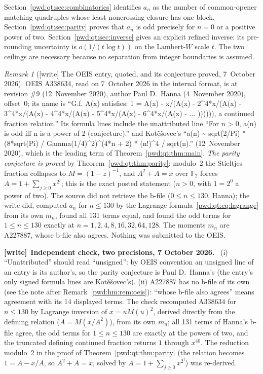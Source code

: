 \documentclass[11pt,letterpaper]{article}
\numberwithin{equation}{section}
\theoremstyle{remark}\newtheorem{remark}[theorem]{Remark}
\newenvironment{writenote}[1][]{\par\smallskip\begingroup\small
 \noindent\textbf{[write]}\if\relax\detokenize{#1}\relax\else~\textbf{#1.}\fi\ }%
 {\par\endgroup\smallskip}
\begin{document}
Section~\ref{pwd:qt:sec:combinatorics} identifies $a_n$ as the number of common-opener matching quadruples whose least noncrossing closure has one block. Section~\ref{pwd:qt:sec:parity} proves that $a_n$ is odd precisely for $n=0$ or a positive power of two. Section~\ref{pwd:qt:sec:inverse} gives an explicit refined inverse: its pre-rounding uncertainty is $o(1/(t\log t))$ on the Lambert-$W$ scale $t$. The two ceilings are necessary because no separation from integer boundaries is assumed.

\begin{remark}[{[write]} The OEIS entry, quoted, and its conjecture proved, 7~October 2026]\label{pwd:qt:rem:oeis}
OEIS A338634, read on 7~October 2026 in the internal format, is at revision
\#9 (12~November 2020), author Paul D.~Hanna (4~November 2020), offset~0; its
name is ``G.f. A(x) satisfies: 1 = A(x) - x/(A(x) - 2\^{}4*x/(A(x) -
3\^{}4*x/(A(x) - 4\^{}4*x/(A(x) - 5\^{}4*x/(A(x) - 6\^{}4*x/(A(x) - ...
)))))), a continued fraction relation.'' Its formula lines include
the unattributed line ``For n > 0, a(n) is odd iff n is a power of 2
(conjecture).'' and Kot\v e\v sovec's ``a(n) \textasciitilde{} sqrt(2/Pi) *
(8*sqrt(Pi) / Gamma(1/4)\^{}2)\^{}(4*n + 2) * (n!)\^{}4 / sqrt(n).'' (12~November
2020), which is the leading term of Theorem~\ref{pwd:qt:thm:main}. \emph{The
parity conjecture is proved} by Theorem~\ref{pwd:qt:thm:parity}: modulo~2 the
Stieltjes fraction collapses to $M=(1-z)^{-1}$, and $A^2+A=x$ over
$\mathbb F_2$ forces $A=1+\sum_{j\ge0}x^{2^j}$; this is the exact posted
statement ($n>0$, with $1=2^0$ a power of two). The source did not retrieve
the b-file ($0\le n\le130$, Hanna); the write did, computed $a_n$ for
$n\le130$ by the Lagrange formula~\eqref{pwd:qt:eq:lagrange} from its own
$m_n$, found all 131 terms equal, and found the odd terms for $1\le n\le130$
exactly at $n=1,2,4,8,16,32,64,128$. The moments $m_n$ are A227887, whose
b-file also agrees. Nothing was submitted to the OEIS.
\end{remark}
\begin{writenote}[Independent check, two precisions, 7 October 2026]
(i) ``Unattributed'' should read ``unsigned'': by OEIS convention an
unsigned line of an entry is its author's, so the parity conjecture is Paul
D.~Hanna's (the entry's only signed formula lines are Kot\v e\v sovec's). (ii) A227887
has no b-file of its own (see the note after Remark~\ref{pwd:hm:rem:oeis}):
``whose b-file also agrees'' means agreement with its 14 displayed terms.
The check recomputed A338634 for $n\le130$ by Lagrange inversion of
$x=uM(u)^2$, derived directly from the defining relation ($A=M(x/A^2)$), from
its own $m_n$; all 131 terms of Hanna's b-file agree, the odd terms for
$1\le n\le130$ are exactly at the powers of two, and the truncated defining
continued fraction returns $1$ through $x^{40}$. The reduction modulo~2 in
the proof of Theorem~\ref{pwd:qt:thm:parity} (the relation becomes
$1=A-x/A$, so $A^2+A=x$, solved by $A=1+\sum_{j\ge0}x^{2^j}$) was re-derived.
\end{writenote}
\end{document}
